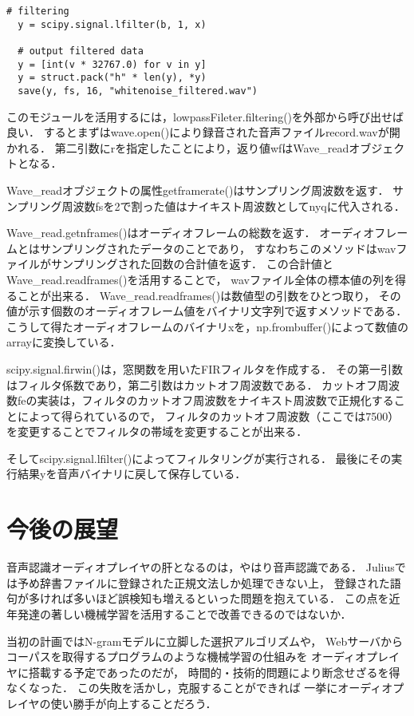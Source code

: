 \documentclass{jsarticle}
\begin{document}
\begin{multicols}{2}
\begin{lstlisting}[caption=RaspiAudio/voice/lowpassFilter.py,label=filter]
  # filtering
  y = scipy.signal.lfilter(b, 1, x)

  # output filtered data
  y = [int(v * 32767.0) for v in y]
  y = struct.pack("h" * len(y), *y)
  save(y, fs, 16, "whitenoise_filtered.wav")
\end{lstlisting}

このモジュールを活用するには，lowpassFileter.filtering()を外部から呼び出せば良い．
するとまずはwave.open()により録音された音声ファイルrecord.wavが開かれる．
第二引数にrを指定したことにより，返り値wfはWave\_readオブジェクトとなる．

Wave\_readオブジェクトの属性getframerate()はサンプリング周波数を返す．
サンプリング周波数fsを2で割った値はナイキスト周波数としてnyqに代入される．

Wave\_read.getnframes()はオーディオフレームの総数を返す．
オーディオフレームとはサンプリングされたデータのことであり，
すなわちこのメソッドはwavファイルがサンプリングされた回数の合計値を返す．
この合計値とWave\_read.readframes()を活用することで，
wavファイル全体の標本値の列を得ることが出来る．
Wave\_read.readframes()は数値型の引数をひとつ取り，
その値が示す個数のオーディオフレーム値をバイナリ文字列で返すメソッドである．
こうして得たオーディオフレームのバイナリxを，np.frombuffer()によって数値のarrayに変換している．

scipy.signal.firwin()は，窓関数を用いたFIRフィルタを作成する．
その第一引数はフィルタ係数であり，第二引数はカットオフ周波数である．
カットオフ周波数feの実装は，フィルタのカットオフ周波数をナイキスト周波数で正規化することによって得られているので，
フィルタのカットオフ周波数（ここでは7500）を変更することでフィルタの帯域を変更することが出来る．

そしてscipy.signal.lfilter()によってフィルタリングが実行される．
最後にその実行結果yを音声バイナリに戻して保存している．

\section{今後の展望}
\label{sec:今後の展望}
\label{今後の展望}

音声認識オーディオプレイヤの肝となるのは，やはり音声認識である．
Juliusでは予め辞書ファイルに登録された正規文法しか処理できない上，
登録された語句が多ければ多いほど誤検知も増えるといった問題を抱えている．
この点を近年発達の著しい機械学習を活用することで改善できるのではないか．

当初の計画ではN-gramモデルに立脚した選択アルゴリズムや，
Webサーバからコーパスを取得するプログラムのような機械学習の仕組みを
オーディオプレイヤに搭載する予定であったのだが，
時間的・技術的問題により断念せざるを得なくなった．
この失敗を活かし，克服することができれば
一挙にオーディオプレイヤの使い勝手が向上することだろう．


\end{multicols}
\end{document}
